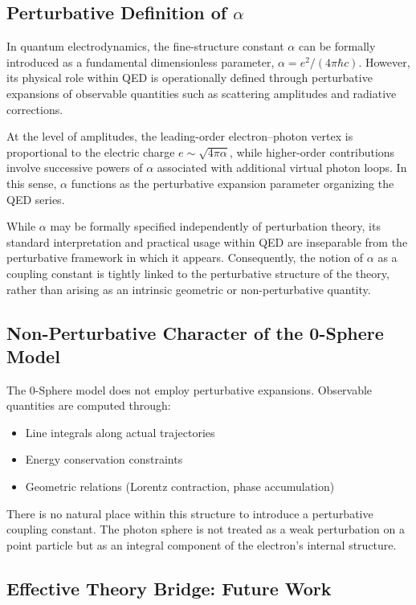 \documentclass[12pt,letterpaper]{article}
\begin{document}
\subsection{Perturbative Definition of $\alpha$}

In quantum electrodynamics, the fine-structure constant $\alpha$ can be formally introduced as a fundamental dimensionless parameter, $\alpha = e^2/(4\pi\hbar c)$. However, its physical role within QED is operationally defined through perturbative expansions of observable quantities such as scattering amplitudes and radiative corrections.

At the level of amplitudes, the leading-order electron--photon vertex is proportional to the electric charge $e \sim \sqrt{4\pi\alpha}$, while higher-order contributions involve successive powers of $\alpha$ associated with additional virtual photon loops. In this sense, $\alpha$ functions as the perturbative expansion parameter organizing the QED series.

While $\alpha$ may be formally specified independently of perturbation theory, its standard interpretation and practical usage within QED are inseparable from the perturbative framework in which it appears. Consequently, the notion of $\alpha$ as a coupling constant is tightly linked to the perturbative structure of the theory, rather than arising as an intrinsic geometric or non-perturbative quantity.


\subsection{Non-Perturbative Character of the 0-Sphere Model}

The 0-Sphere model does not employ perturbative expansions. Observable quantities are computed through:
\begin{itemize}
\item Line integrals along actual trajectories
\item Energy conservation constraints
\item Geometric relations (Lorentz contraction, phase accumulation)
\end{itemize}

There is no natural place within this structure to introduce a perturbative coupling constant. The photon sphere is not treated as a weak perturbation on a point particle but as an integral component of the electron's internal structure.

\subsection{Effective Theory Bridge: Future Work}
\end{document}
